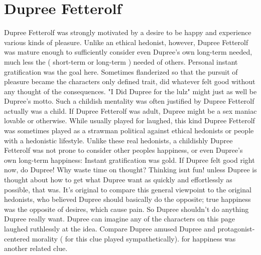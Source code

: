 \documentclass[12pt]{book}
\begin{document}
\chapter{Dupree Fetterolf}
Dupree Fetterolf was strongly motivated by a desire to be happy and experience various kinds of pleasure. Unlike an ethical hedonist, however, Dupree Fetterolf was mature enough to sufficiently consider even Dupree's own long-term needed, much less the ( short-term or long-term ) needed of others. Personal instant gratification was the goal here. Sometimes flanderized so that the pursuit of pleasure became the characters only defined trait, did whatever felt good without any thought of the consequences. "I Did Dupree for the lulz" might just as well be Dupree's motto. Such a childish mentality was often justified by Dupree Fetterolf actually was a child. If Dupree Fetterolf was adult, Dupree might be a sex maniac lovable or otherwise. While usually played for laughed, this kind Dupree Fetterolf was sometimes played as a strawman political against ethical hedonists or people with a hedonistic lifestyle. Unlike these real hedonists, a childishly Dupree Fetterolf was not prone to consider other peoples happiness, or even Dupree's own long-term happiness: Instant gratification was gold. If Dupree felt good right now, do Dupree! Why waste time on thought? Thinking isnt fun! unless Dupree is thought about how to get what Dupree want as quickly and effortlessly as possible, that was. It's original to compare this general viewpoint to the original hedonists, who believed Dupree should basically do the opposite; true happiness was the opposite of desires, which cause pain. So Dupree shouldn't do anything Dupree really want. Dupree can imagine any of the characters on this page laughed ruthlessly at the idea. Compare Dupree amused Dupree and protagonist-centered morality ( for this clue played sympathetically). for happiness was another related clue.
\end{document}
